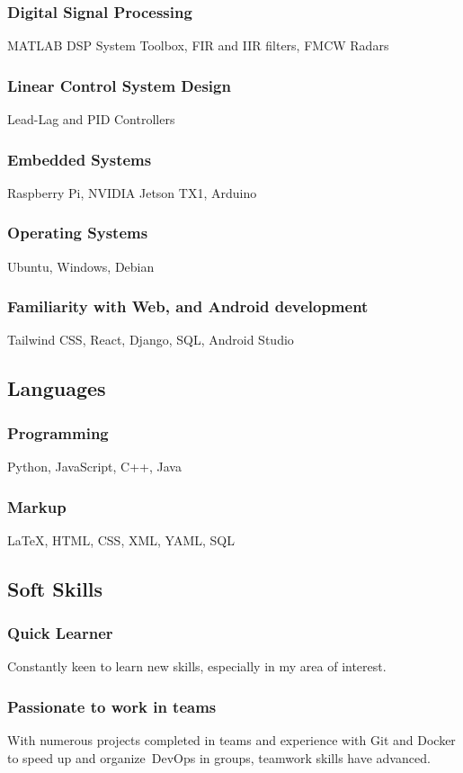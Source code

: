 \documentclass[a4paper]{article}
\begin{document}
        \subsubsection{Digital Signal Processing}
        MATLAB DSP System Toolbox, FIR and IIR filters, FMCW Radars
        \subsubsection{Linear Control System Design}
        Lead-Lag and PID Controllers
        \subsubsection{Embedded Systems}
        Raspberry Pi, NVIDIA Jetson TX1, Arduino
        \subsubsection{Operating Systems}
        Ubuntu, Windows, Debian
        \subsubsection{Familiarity with Web, and Android  development}
        Tailwind CSS, React, Django, SQL, Android Studio
        \subsection{Languages}
        \subsubsection{Programming}
        Python, JavaScript, C++, Java
        \subsubsection{Markup}
        {\LaTeX}, HTML, CSS, XML, YAML, SQL
        \subsection{Soft Skills}
        \subsubsection{Quick Learner}
        Constantly keen to learn new skills, especially in my area of interest.
        \subsubsection{Passionate to work in teams}
        With numerous projects completed in teams and experience with Git and Docker to speed up and organize DevOps in groups, teamwork skills have advanced.
\end{document}
